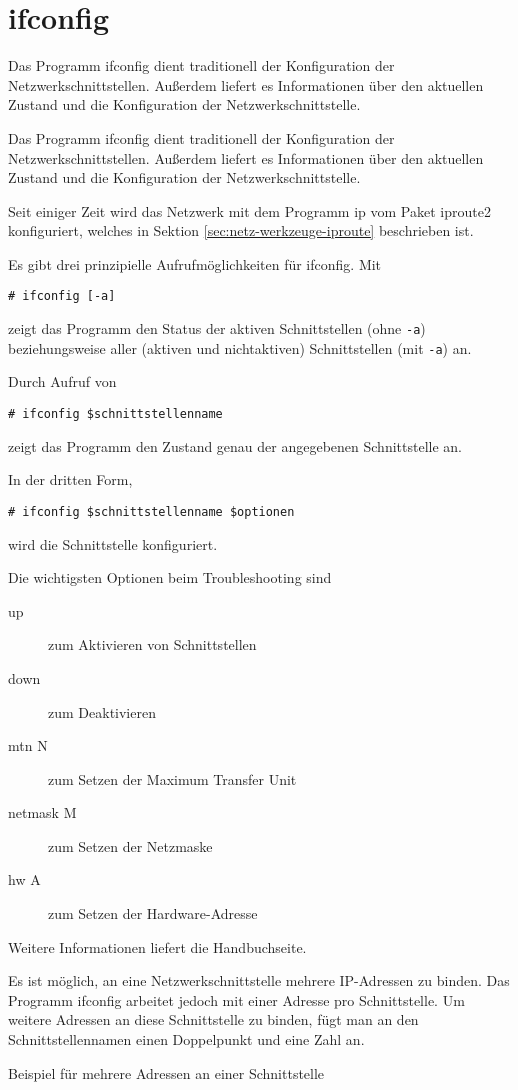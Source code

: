 \section{ifconfig}
\label{sec:netz-werkzeuge-ifconfig}
\begin{abstractsec}
  Das Programm ifconfig dient traditionell der Konfiguration der
  Netzwerkschnittstellen. Außerdem liefert es Informationen über den aktuellen
  Zustand und die Konfiguration der Netzwerkschnittstelle.
\end{abstractsec}
\begin{normaltext}
  Das Programm ifconfig dient traditionell der Konfiguration der
  Netzwerkschnittstellen. Außerdem liefert es Informationen über den aktuellen
  Zustand und die Konfiguration der Netzwerkschnittstelle.

  Seit einiger Zeit wird das Netzwerk mit dem Programm ip vom Paket iproute2
  konfiguriert, welches in Sektion \ref{sec:netz-werkzeuge-iproute}
  beschrieben ist.

  Es gibt drei prinzipielle Aufrufmöglichkeiten für ifconfig. Mit
  \begin{verbatim}
# ifconfig [-a]
  \end{verbatim}
  zeigt das Programm den Status der aktiven Schnittstellen (ohne \verb?-a?)
  beziehungsweise aller (aktiven und nichtaktiven) Schnittstellen (mit
  \verb?-a?) an.

  Durch Aufruf von
  \begin{verbatim}
# ifconfig $schnittstellenname
  \end{verbatim}
  zeigt das Programm den Zustand genau der angegebenen Schnittstelle an.

  In der dritten Form,
  \begin{verbatim}
# ifconfig $schnittstellenname $optionen
  \end{verbatim}
  wird die Schnittstelle konfiguriert.

  Die wichtigsten Optionen beim Troubleshooting sind
  \begin{description}
    \item[up] zum Aktivieren von Schnittstellen
    \item[down] zum Deaktivieren
    \item[mtn N] zum Setzen der Maximum Transfer Unit
    \item[netmask M] zum Setzen der Netzmaske
    \item[hw A] zum Setzen der Hardware-Adresse
  \end{description}

  Weitere Informationen liefert die Handbuchseite.

  Es ist möglich, an eine Netzwerkschnittstelle mehrere IP-Adressen zu binden.
  Das Programm ifconfig arbeitet jedoch mit einer Adresse pro Schnittstelle.
  Um weitere Adressen an diese Schnittstelle zu binden, fügt man an den
  Schnittstellennamen einen Doppelpunkt und eine Zahl an.

  \begin{notes}
  \item Beispiel für mehrere Adressen an einer Schnittstelle
  \end{notes}
\end{normaltext}

